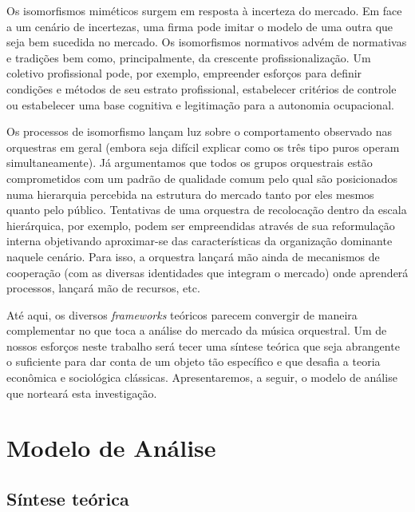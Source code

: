 \documentclass[a4paper, 12pt, openright, oneside, german, french, english, brazil]{abntex2}
\begin{document}
	Os isomorfismos miméticos surgem em resposta à incerteza do mercado. Em face a um cenário de incertezas, uma firma pode imitar o modelo de uma outra que seja bem sucedida no mercado. Os isomorfismos normativos advém de normativas e tradições bem como, principalmente, da crescente profissionalização. Um coletivo profissional pode, por exemplo, empreender esforços para definir condições e métodos de seu estrato profissional, estabelecer critérios de controle ou estabelecer uma base cognitiva e legitimação para a autonomia ocupacional.

	Os processos de isomorfismo lançam luz sobre o comportamento observado nas orquestras em geral (embora seja difícil explicar como os três tipo puros operam simultaneamente). Já argumentamos que todos os grupos orquestrais estão comprometidos com um padrão de qualidade comum pelo qual são posicionados numa hierarquia percebida na estrutura do mercado tanto por eles mesmos quanto pelo público. Tentativas de uma orquestra de recolocação dentro da escala hierárquica, por exemplo, podem ser empreendidas através de sua reformulação interna objetivando aproximar-se das características da organização dominante naquele cenário. Para isso, a orquestra lançará mão ainda de mecanismos de cooperação (com as diversas identidades que integram o mercado) onde aprenderá processos, lançará mão de recursos, etc.

	Até aqui, os diversos \textit{frameworks} teóricos parecem convergir de maneira complementar no que toca a análise do mercado da música orquestral. Um de nossos esforços neste trabalho será tecer uma síntese teórica que seja abrangente o suficiente para dar conta de um objeto tão específico e que desafia a teoria econômica e sociológica clássicas. Apresentaremos, a seguir, o modelo de análise que norteará esta investigação.


	\chapter{Modelo de Análise}

	\section{Síntese teórica}
\end{document}
